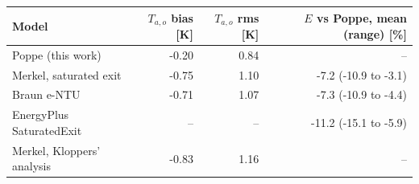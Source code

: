 \begin{tabular}{lrrr}
\toprule
Model & $T_{a,o}$ bias [K] & $T_{a,o}$ rms [K] & $E$ vs Poppe, mean (range) [\%] \\
\midrule
Poppe (this work) & -0.20 & 0.84 & -- \\
Merkel, saturated exit & -0.75 & 1.10 & -7.2 (-10.9 to -3.1) \\
Braun e-NTU & -0.71 & 1.07 & -7.3 (-10.9 to -4.4) \\
EnergyPlus SaturatedExit & -- & -- & -11.2 (-15.1 to -5.9) \\
Merkel, Kloppers' analysis & -0.83 & 1.16 & -- \\
\bottomrule
\end{tabular}
